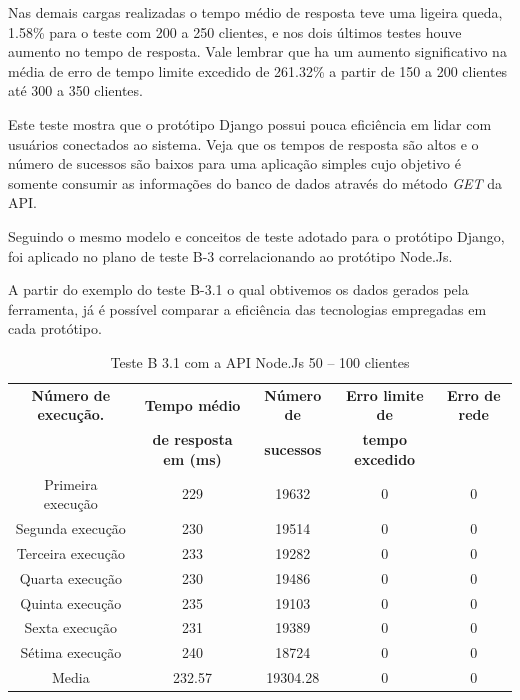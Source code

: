   Nas demais cargas realizadas o tempo médio de resposta teve uma ligeira queda, 1.58\% para o teste com 200 a 250 clientes, e nos dois
  últimos testes houve aumento no tempo de resposta. Vale lembrar que ha um aumento significativo na média de erro de tempo limite
  excedido de 261.32\% a partir de 150 a 200 clientes até 300 a 350 clientes.

  Este teste mostra que o protótipo Django possui pouca eficiência em lidar com usuários conectados ao sistema. Veja que os tempos de
  resposta são altos e o número de sucessos são baixos para uma aplicação simples cujo objetivo é somente consumir as informações do banco de
  dados através do método \textit{GET} da API.

  Seguindo o mesmo modelo e conceitos de teste adotado para o protótipo Django, foi aplicado no plano de teste
  B-3 correlacionando ao protótipo Node.Js.

  A partir do exemplo do teste B-3.1 o qual obtivemos os dados gerados pela ferramenta, já é possível comparar a eficiência das
  tecnologias empregadas em cada protótipo.

  \begin{table}[H]
    \centering
    \footnotesize
    \setlength{\abovecaptionskip}{0pt}
    \setlength{\belowcaptionskip}{0pt}
    \caption[Teste B-3.1 com a API Node.Js 50 – 100 clientes]{Teste B 3.1 com a API Node.Js 50 – 100 clientes}
    \label{tab:teste-b-3-1}
    \begin{tabular}{c|c|c|c|c}
      \hline \hline
      \textbf{Número de execução.} & \textbf{Tempo médio } &	\textbf{Número de } & \textbf{Erro limite de} & \textbf{Erro de rede}  \\
      {}			   & \textbf{de resposta em (ms) } &\textbf{sucessos } & \textbf{tempo excedido} & {}  \\
      \hline \hline
      Primeira execução &	229 &				19632 &			0 &				0 \\
      Segunda execução &	230 &				19514 &			0 &				0 \\
      Terceira execução &	233 &				19282 &			0 &				0 \\
      Quarta execução  &	230 &				19486 &			0 &				0 \\
      Quinta execução  &	235 &				19103 &			0 &				0 \\
      Sexta execução   &	231 &				19389 &			0 &				0 \\
      Sétima execução  &	240 &				18724 &			0 &				0 \\
      Media & 			232.57 &			19304.28 & 		0 &				0 \\
      \hline \hline
    \end{tabular}
  \end{table}

